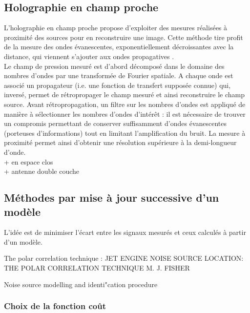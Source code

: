 \subsection{Holographie en champ proche}
L'holographie en champ proche propose d'exploiter des mesures réalisées à proximité des sources pour en reconstruire une image. Cette méthode tire profit de la mesure des ondes évanescentes, exponentiellement décroissantes avec la distance, qui viennent s'ajouter aux ondes propagatives \cite{Maynard1985}.\\
Le champ de pression mesuré est d'abord décomposé dans le domaine des nombres d'ondes par une transformée de Fourier spatiale. A chaque onde est associé un propagateur (i.e. une fonction de transfert supposée connue) qui, inversé, permet de rétropropager le champ mesuré et ainsi reconstruire le champ source.  Avant rétropropagation, un filtre sur les nombres d'ondes est appliqué de manière à sélectionner les nombres d'ondes d'intérêt : il est nécessaire de trouver un compromis permettant de conserver suffisamment d'ondes évanescentes (porteuses d'informations) tout en limitant l'amplification du bruit. La mesure à proximité permet ainsi d'obtenir une résolution supérieure à la demi-longueur d'onde.\\


+ en espace clos\\

+ antenne double couche




\subsection{Méthodes par mise à jour successive d'un modèle}
L'idée est de minimiser l'écart entre les signaux mesurés et ceux calculés à partir d'un modèle.

The polar correlation technique : JET ENGINE NOISE SOURCE LOCATION: 
THE 
POLAR 
CORRELATION 
TECHNIQUE 
M. 
J. 
FISHER

Noise source modelling and identi"cation procedure

\subsubsection{Choix de la fonction coût}

